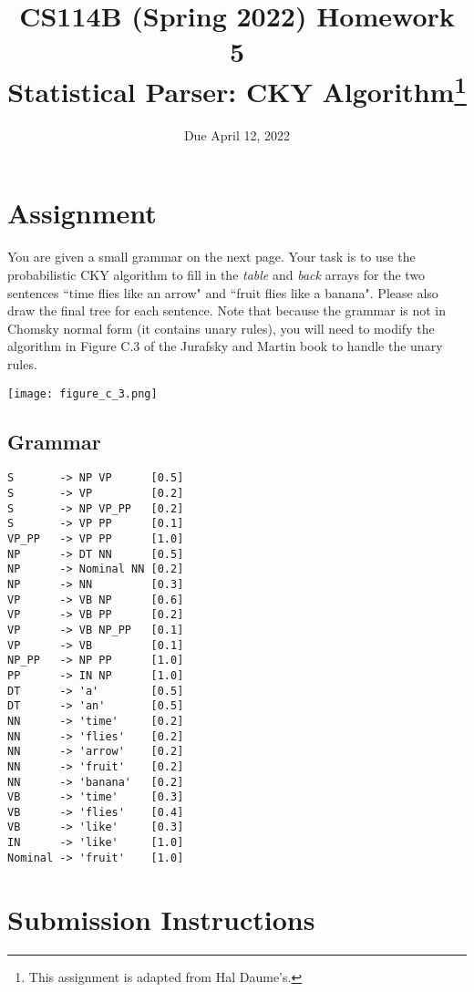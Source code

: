 \documentclass[11pt,letterpaper]{article}
\begin{document}
\title{CS114B (Spring 2022) Homework 5\\Statistical Parser: CKY Algorithm\thanks{This assignment is adapted from Hal Daume's.}}
\author{Due April 12, 2022}
\date{}
\maketitle

\section*{Assignment}

You are given a small grammar on the next page. Your task is to use the probabilistic CKY algorithm to fill in the \textit{table} and \textit{back} arrays for the two sentences ``time flies like an arrow" and ``fruit flies like a banana". Please also draw the final tree for each sentence. Note that because the grammar is not in Chomsky normal form (it contains unary rules), you will need to modify the algorithm in Figure C.3 of the Jurafsky and Martin book to handle the unary rules.

\noindent\texttt{[image: figure\_c\_3.png]}

\subsection*{Grammar}

\begin{verbatim}
S       -> NP VP      [0.5]
S       -> VP         [0.2]
S       -> NP VP_PP   [0.2]
S       -> VP PP      [0.1]
VP_PP   -> VP PP      [1.0]
NP      -> DT NN      [0.5]
NP      -> Nominal NN [0.2]
NP      -> NN         [0.3]
VP      -> VB NP      [0.6]
VP      -> VB PP      [0.2]
VP      -> VB NP_PP   [0.1]
VP      -> VB         [0.1]
NP_PP   -> NP PP      [1.0]
PP      -> IN NP      [1.0]
DT      -> 'a'        [0.5]
DT      -> 'an'       [0.5]
NN      -> 'time'     [0.2]
NN      -> 'flies'    [0.2]
NN      -> 'arrow'    [0.2]
NN      -> 'fruit'    [0.2]
NN      -> 'banana'   [0.2]
VB      -> 'time'     [0.3]
VB      -> 'flies'    [0.4]
VB      -> 'like'     [0.3]
IN      -> 'like'     [1.0]
Nominal -> 'fruit'    [1.0]
\end{verbatim}\newpage

\section*{Submission Instructions}
\end{document}
